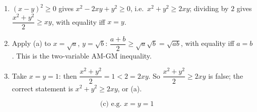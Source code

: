 \begin{enumerate}
\item $(x-y)^2\ge0$ gives $x^2-2xy+y^2\ge0$, i.e.\ $x^2+y^2\ge2xy$; dividing by $2$ gives $\dfrac{x^2+y^2}{2}\ge xy$, with equality iff $x=y$.
\item Apply (a) to $x=\sqrt a$, $y=\sqrt b$: $\dfrac{a+b}{2}\ge\sqrt a\sqrt b=\sqrt{ab}$, with equality iff $a=b$. This is the two-variable AM-GM inequality.
\item Take $x=y=1$: then $\dfrac{x^2+y^2}{2}=1<2=2xy$. So $\dfrac{x^2+y^2}{2}\ge2xy$ is false; the correct statement is $x^2+y^2\ge2xy$, or (a).
\end{enumerate}
\[\boxed{\text{(c) e.g. } x=y=1}\]
